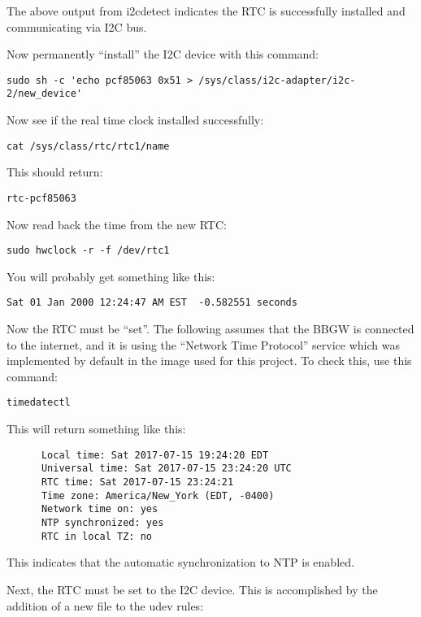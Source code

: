 The above output from i2cdetect indicates the RTC is successfully installed and communicating via I2C bus.

Now permanently ``install'' the I2C device with this command:

\begin{verbatim}
sudo sh -c 'echo pcf85063 0x51 > /sys/class/i2c-adapter/i2c-2/new_device'
\end{verbatim}

Now see if the real time clock installed successfully:

\begin{verbatim}
cat /sys/class/rtc/rtc1/name
\end{verbatim}

This should return:

\begin{verbatim}
rtc-pcf85063
\end{verbatim}

Now read back the time from the new RTC:

\begin{verbatim}
sudo hwclock -r -f /dev/rtc1
\end{verbatim}

You will probably get something like this:

\begin{verbatim}
Sat 01 Jan 2000 12:24:47 AM EST  -0.582551 seconds
\end{verbatim}

Now the RTC must be ``set''.  The following assumes that the BBGW is connected to the internet, and it is using the ``Network Time Protocol'' service which was implemented by default in the image used for this project.
To check this, use this command:

\begin{verbatim}
timedatectl
\end{verbatim}

This will return something like this:

\begin{verbatim}
      Local time: Sat 2017-07-15 19:24:20 EDT
      Universal time: Sat 2017-07-15 23:24:20 UTC
      RTC time: Sat 2017-07-15 23:24:21
      Time zone: America/New_York (EDT, -0400)
      Network time on: yes
      NTP synchronized: yes
      RTC in local TZ: no
\end{verbatim}

This indicates that the automatic synchronization to NTP is enabled.

Next, the RTC must be set to the I2C device.  This is accomplished by the addition of a new file to the udev rules:

